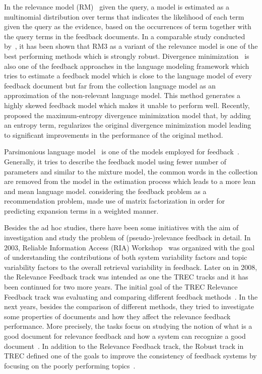 In the relevance model (RM)~\citep{Abdul-jaleel:2004,Lavrenko:2001} given the query, a model is estimated as a multinomial distribution over terms that indicates the likelihood of each term given the query as the evidence, based on the occurrences of term together with the query terms in the feedback documents.  In a comparable study conducted by~\citet{Zhai:SMM:2001}, it has been shown that RM3 as a variant of the relevance model is one of the best performing methods which is strongly robust.
Divergence minimization~\citep{Zhai:SMM:2001} is also one of the feedback approaches in the language modeling framework which tries to estimate a feedback model which is close to the language model of every feedback document but far from the collection language model as an approximation of the non-relevant language model. This method generates a highly skewed feedback model which makes it unable to perform well. Recently, \citet{Lv:2014} proposed the maximum-entropy divergence minimization model that, by adding an entropy term, regularizes the original divergence minimization model leading to significant improvements in the performance of the original method.

Parsimonious language model~\citep{Hiemstra:2004} is one of the models employed for feedback~\citep{Meij:2008,Hiemstra:2008:TREC,Kaptein:2008:TREC}. Generally, it tries to describe the feedback model using fewer number of parameters and similar to the mixture model, the common words in the collection are removed from the model in the estimation process which leads to a more lean and mean language model.  \citet{Zamani:2016a} considering the feedback problem as a recommendation problem, made use of matrix factorization in order for predicting expansion terms in a weighted manner.

Besides the ad hoc studies, there have been some initiatives with the aim of investigation and study the problem of (pseudo-)relevance feedback in detail. In 2003, Reliable Information Access (RIA) Workshop~\citep{Harman:2009,Warren:2004} 
was organized with the goal of understanding the contributions of both system variability factors and topic variability factors to the overall retrieval variability in feedback. 
Later on in 2008, the Relevance Feedback track was intended as one the TREC tracks and it has been continued for two more years. The initial goal of the TREC Relevance Feedback track was evaluating and comparing different feedback methods~\citep{Buckley:2008:TREC}. In the next years, besides the comparison of different methods, they tried to investigate some properties of documents and how they affect the relevance feedback performance. More precisely, the tasks focus on studying the notion of what is a good document for relevance feedback and how a system can recognize a good document~\citep{Buckley:2010:TREC}. 
In addition to the Relevance Feedback track, the Robust track in TREC defined one of the goals to improve the consistency of feedback systems by focusing on the poorly performing topics~\citep{Voorhees:2003:TREC}.

